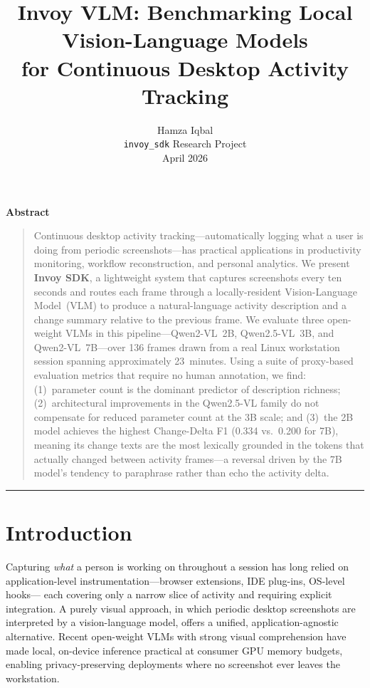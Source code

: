 \documentclass[10pt, twocolumn]{article}
\title{%
  \vspace{-1.5em}%
  \LARGE\bfseries Invoy VLM: Benchmarking Local Vision-Language Models\\[4pt]
  for Continuous Desktop Activity Tracking%
  \vspace{0.3em}
}
\author{%
  Hamza Iqbal\\[2pt]
  \small \texttt{invoy\_sdk} Research Project\\
  \small April 2026
}
\date{}
\renewenvironment{abstract}{%
  \small\begin{center}{\bfseries Abstract}\end{center}%
  \begin{quotation}\noindent\ignorespaces
}{%
  \end{quotation}\medskip\hrule\medskip
}
\begin{document}
\maketitle
\thispagestyle{fancy}

\begin{abstract}
Continuous desktop activity tracking---automatically logging what a user is doing
from periodic screenshots---has practical applications in productivity monitoring,
workflow reconstruction, and personal analytics. We present \textbf{Invoy SDK}, a
lightweight system that captures screenshots every ten seconds and routes each frame
through a locally-resident Vision-Language Model~(VLM) to produce a natural-language
activity description and a change summary relative to the previous frame. We evaluate
three open-weight VLMs in this pipeline---Qwen2-VL~2B, Qwen2.5-VL~3B, and
Qwen2-VL~7B---over 136 frames drawn from a real Linux workstation session spanning
approximately 23~minutes. Using a suite of proxy-based evaluation metrics that require
no human annotation, we find: (1)~parameter count is the dominant predictor of
description richness; (2)~architectural improvements in the Qwen2.5-VL family do not
compensate for reduced parameter count at the 3B scale; and (3)~the 2B model achieves the highest Change-Delta F1 (0.334 vs.\ 0.200 for 7B),
meaning its change texts are the most lexically grounded in the tokens that actually
changed between activity frames---a reversal driven by the 7B model's tendency to
paraphrase rather than echo the activity delta.
\end{abstract}

\section{Introduction}
\label{sec:intro}

Capturing \emph{what} a person is working on throughout a session has long relied on
application-level instrumentation---browser extensions, IDE plug-ins, OS-level hooks---
each covering only a narrow slice of activity and requiring explicit integration. A
purely visual approach, in which periodic desktop screenshots are interpreted by a
vision-language model, offers a unified, application-agnostic alternative.
Recent open-weight VLMs with strong visual comprehension have made local, on-device
inference practical at consumer GPU memory budgets, enabling privacy-preserving
deployments where no screenshot ever leaves the workstation.
\end{document}
